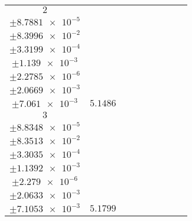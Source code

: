 \documentclass[8pt]{article}
\begin{document}
\begin{longtable}[l]{c c c c c c c c c}
$\num{2}$ & \begin{tabular}[c]{@{}c@{}}$\num{6.0499e-2}$ \\ $\pm\num{8.7881e-5}$\end{tabular} & \begin{tabular}[c]{@{}c@{}}$\num{0.1443}$ \\ $\pm\num{8.3996e-2}$\end{tabular} & \begin{tabular}[c]{@{}c@{}}$\num{-4.4396}$ \\ $\pm\num{3.3199e-4}$\end{tabular} & \begin{tabular}[c]{@{}c@{}}$\num{1.3298e+3}$ \\ $\pm\num{1.139e-3}$\end{tabular} & \begin{tabular}[c]{@{}c@{}}$\num{2.6603}$ \\ $\pm\num{2.2785e-6}$\end{tabular} & \begin{tabular}[c]{@{}c@{}}$\num{1.173}$ \\ $\pm\num{2.0669e-3}$\end{tabular} & \begin{tabular}[c]{@{}c@{}}$\num{4.2078}$ \\ $\pm\num{7.061e-3}$\end{tabular} & $\num{5.1486}$\\
$\num{3}$ & \begin{tabular}[c]{@{}c@{}}$\num{6.1039e-2}$ \\ $\pm\num{8.8348e-5}$\end{tabular} & \begin{tabular}[c]{@{}c@{}}$\num{0.17438}$ \\ $\pm\num{8.3513e-2}$\end{tabular} & \begin{tabular}[c]{@{}c@{}}$\num{4.4379}$ \\ $\pm\num{3.3035e-4}$\end{tabular} & \begin{tabular}[c]{@{}c@{}}$\num{1.3386e+3}$ \\ $\pm\num{1.1392e-3}$\end{tabular} & \begin{tabular}[c]{@{}c@{}}$\num{2.678}$ \\ $\pm\num{2.279e-6}$\end{tabular} & \begin{tabular}[c]{@{}c@{}}$\num{1.1746}$ \\ $\pm\num{2.0633e-3}$\end{tabular} & \begin{tabular}[c]{@{}c@{}}$\num{4.2403}$ \\ $\pm\num{7.1053e-3}$\end{tabular} & $\num{5.1799}$\\

\end{longtable}
\end{document}
